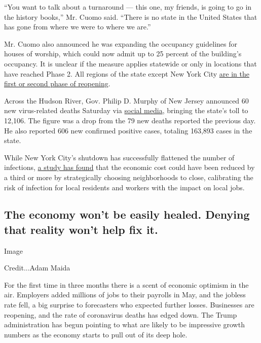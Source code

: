 ``You want to talk about a turnaround --- this one, my friends, is going
to go in the history books,'' Mr. Cuomo said. ``There is no state in the
United States that has gone from where we were to where we are.''

Mr. Cuomo also announced he was expanding the occupancy guidelines for
houses of worship, which could now admit up to 25 percent of the
building's occupancy. It is unclear if the measure applies statewide or
only in locations that have reached Phase 2. All regions of the state
except New York City \href{https://forward.ny.gov/}{are in the first or
second phase of reopening}.

Across the Hudson River, Gov. Philip D. Murphy of New Jersey announced
60 new virus-related deaths Saturday via
\href{https://twitter.com/GovMurphy/status/1269316516962545666?s=20}{social
media}, bringing the state's toll to 12,106. The figure was a drop from
the 79 new deaths reported the previous day. He also reported 606 new
confirmed positive cases, totaling 163,893 cases in the state.

While New York City's shutdown has successfully flattened the number of
infections,
\href{https://www.nytimes3xbfgragh.onion/2020/06/06/business/economy/coronavirus-closings-strategy.html}{a
study has found} that the economic cost could have been reduced by a
third or more by strategically choosing neighborhoods to close,
calibrating the risk of infection for local residents and workers with
the impact on local jobs.

\hypertarget{the-economy-wont-be-easily-healed-denying-that-reality-wont-help-fix-it}{%
\subsection{The economy won't be easily healed. Denying that reality
won't help fix
it.}\label{the-economy-wont-be-easily-healed-denying-that-reality-wont-help-fix-it}}

Image

Credit...Adam Maida

For the first time in three months there is a scent of economic optimism
in the air. Employers added millions of jobs to their payrolls in May,
and the jobless rate fell, a big surprise to forecasters who expected
further losses. Businesses are reopening, and the rate of coronavirus
deaths has edged down. The Trump administration has begun pointing to
what are likely to be impressive growth numbers as the economy starts to
pull out of its deep hole.

